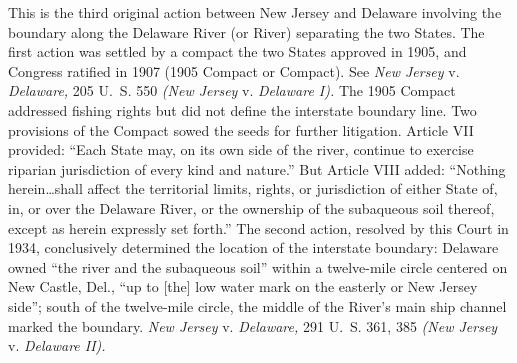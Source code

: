 
\setcounter{page}{576}

  This is the third original action between New Jersey and Delaware
involving the boundary along the Delaware River (or River) separating
the two States. The first action was settled by a compact the two
States approved in 1905, and Congress ratified in 1907 (1905 Compact or
Compact). See \emph{New Jersey} v. \emph{Delaware,} 205 U.~S. 550 \emph{(New
Jersey} v. \emph{Delaware I).} The 1905 Compact addressed fishing rights
but did not define the interstate boundary line. Two provisions of the
Compact sowed the seeds for further litigation. Article VII provided:
``Each State may, on its own side of the river, continue to exercise
riparian jurisdiction of every kind and nature.'' But Article VIII
added: ``Nothing herein\dots shall affect the territorial limits,
rights, or jurisdiction of either State of, in, or over the Delaware
River, or the ownership of the subaqueous soil thereof, except as
herein expressly set forth.'' The second action, resolved by this
Court in 1934, conclusively determined the location of the interstate
boundary: Delaware owned ``the river and the subaqueous soil'' within
a twelve-mile circle centered on New Castle, Del., ``up to [the]
low water mark on the easterly or New Jersey side''; south of the
twelve-mile circle, the middle of the River's main ship channel marked
the boundary. \emph{New Jersey} v. \emph{Delaware,} 291 U.~S. 361, 385
\emph{(New Jersey} v. \emph{Delaware II).}

